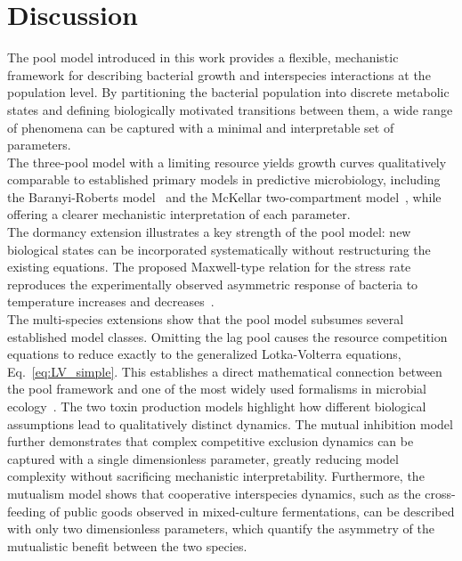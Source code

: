 \documentclass[10pt,1p,authoryear]{elsarticle}
\numberwithin{equation}{section}
\begin{document}
\section{Discussion}
%
The pool model introduced in this work provides a flexible, mechanistic framework
for describing bacterial growth and interspecies interactions at the population level.
By partitioning the bacterial population into discrete metabolic states and defining
biologically motivated transitions between them, a wide range of phenomena can be
captured with a minimal and interpretable set of parameters.\\
%
The three-pool model with a limiting resource yields growth curves qualitatively
comparable to established primary models in predictive microbiology, including the
Baranyi-Roberts model~\citep{baranyi_dynamic_1994} and the McKellar
two-compartment model~\citep{McKellar1997}, while offering a clearer mechanistic interpretation of each parameter.\\
%
The dormancy extension illustrates a key strength of the pool model: new biological
states can be incorporated systematically without restructuring the existing equations.
The proposed Maxwell-type relation for the stress rate reproduces the
experimentally observed asymmetric response of bacteria to temperature increases and
decreases~\citep{swinnen_predictive_2004, hamillMicrobialLag2020}.\\
%
The multi-species extensions show that the pool model subsumes several established
model classes. Omitting the lag pool causes the resource competition equations to reduce exactly to the generalized Lotka-Volterra equations, Eq.~\eqref{eq:LV_simple}. This establishes a direct mathematical connection between the pool framework and one of the most widely used formalisms in microbial ecology~\citep{wangersky_lotka-volterra_1978,
stein_ecological_2013, venturelli_deciphering_2018}.
The two toxin production models highlight how different biological assumptions lead to
qualitatively distinct dynamics. The mutual inhibition model further demonstrates that complex competitive exclusion
dynamics can be captured with a single dimensionless parameter, greatly
reducing model complexity without sacrificing mechanistic interpretability. Furthermore, the mutualism model shows that cooperative interspecies dynamics, 
such as the cross-feeding of public goods observed in mixed-culture fermentations, can be described with only two dimensionless parameters, which quantify the asymmetry of the mutualistic benefit between the two species.\\
\end{document}
